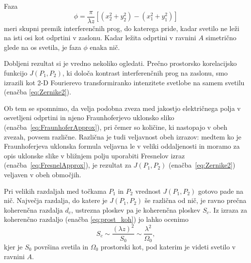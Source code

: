 Faza 
\begin{equation}
\phi=\frac{\pi}{\lambda z}[(x_{2}^{2}+y_{2}^{2})-(x_{1}^{2}+y_{1}^{2})]
\end{equation}
meri skupni premik interferenčnih prog, do katerega pride, kadar svetilo
ne leži na isti osi kot odprtini v zaslonu. Kadar ležita odprtini v ravnini $A$ 
simetrično glede na os svetila, je faza $\phi$ enaka nič.

Dobljeni rezultat si je vredno nekoliko ogledati. Prečno prostorsko
korelacijsko funkcijo $J(P_{1},P_{2})$, ki določa kontrast interferenčnih
prog na zaslonu, smo izrazili kot 2-D  Fourierevo transformiranko intenzitete svetlobe
na samem svetilu (enačba \ref{eq:Zernike2}). 
\begin{remark}
Ob tem se spomnimo,
da velja podobna zveza med jakostjo električnega polja v osvetljeni odprtini 
in njeno Fraunhoferjevo uklonsko sliko (enačba~\ref{eq:FraunhoferApprox}), 
pri čemer so količine, ki nastopajo v obeh zvezah,
povsem različne. Različna je tudi veljavnost obeh izrazov: medtem ko je Fraunhoferjeva
uklonska formula veljavna le v veliki oddaljenosti in moramo za opis uklonske slike v bližnjem polju
uporabiti Fresnelov izraz (enačba~\ref{eq:FresnelApprox}), 
je rezultat za $J(P_{1},P_{2})$ (enačba~\ref{eq:Zernike2}) veljaven v obeh območjih.
\end{remark}

Pri velikih razdaljah med točkama $P_{1}$ in $P_{2}$ vrednost $J(P_{1},P_{2})$ 
gotovo pade na nič. Največja razdalja, do katere je $J(P_{1},P_{2})$ še različna od nič, je ravno
prečna koherenčna razdalja $d_{c}$, ustrezna ploskev pa je koherenčna
ploskev $S_{c}$. Iz izraza za koherenčno razdaljo 
(enačba \ref{eq:prost_koh}) jo lahko ocenimo
\begin{equation}
S_{c}\sim\frac{(\lambda z)^{2}}{S_{0}}\sim\frac{\lambda^{2}}{\Omega_{0}},
\label{eq:koherencna-ploskev}
\end{equation}
kjer je $S_{0}$ površina svetila in $\Omega_{0}$ prostorski kot,
pod katerim je videti svetilo v ravnini $A$. 

